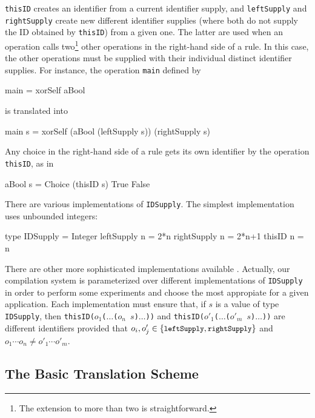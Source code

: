 \documentclass{llncs}
\newcommand{\code}[1]{\mbox{\small\texttt{#1}}}
\begin{document}
\code{thisID} creates an identifier from a current
identifier supply, and
\code{leftSupply} and \code{rightSupply} create
new different identifier supplies (where both do not supply the ID obtained
by \code{thisID}) from a given one.
The latter are used when an operation calls two\footnote{The
extension to more than two is straightforward.}
other operations in the right-hand side of a rule. In this case,
the other operations must be supplied with their individual distinct
identifier supplies. For instance, the operation \code{main}
defined by
\label{sec:xor-main}
\begin{curry}
  main = xorSelf aBool
\end{curry}
is translated into
\begin{haskell}
  main s = xorSelf (aBool (leftSupply s)) (rightSupply s)
\end{haskell}
Any choice in the right-hand side of a rule gets its own identifier
by the operation \code{thisID}, as in
\begin{haskell}
  aBool s = Choice (thisID s) True False
\end{haskell}
There are various implementations of \code{IDSupply}.
The simplest implementation uses unbounded integers:
\begin{haskell}
  type IDSupply = Integer
  leftSupply  n = 2*n
  rightSupply n = 2*n+1
  thisID      n = n
\end{haskell}
There are other more sophisticated implementations available
\cite{AugustssonRittriSynek94}.
Actually, our compilation system is parameterized over different
implementations of \code{IDSupply}
in order to perform some experiments and choose
the most appropiate for a given application.
Each implementation must ensure that, if $s$ is a value of type
\code{IDSupply}, then \code{thisID($o_1$($\ldots$($o_n$ $s$)$\ldots$))}
and \code{thisID($o'_1$($\ldots$($o'_m$ $s$)$\ldots$))}
are different identifiers provided that
$o_i,o'_j \in \{\code{leftSupply},\code{rightSupply}\}$
and $o_1\cdots o_n \neq o'_1\cdots o'_m$.

\subsection{The Basic Translation Scheme}
\end{document}
